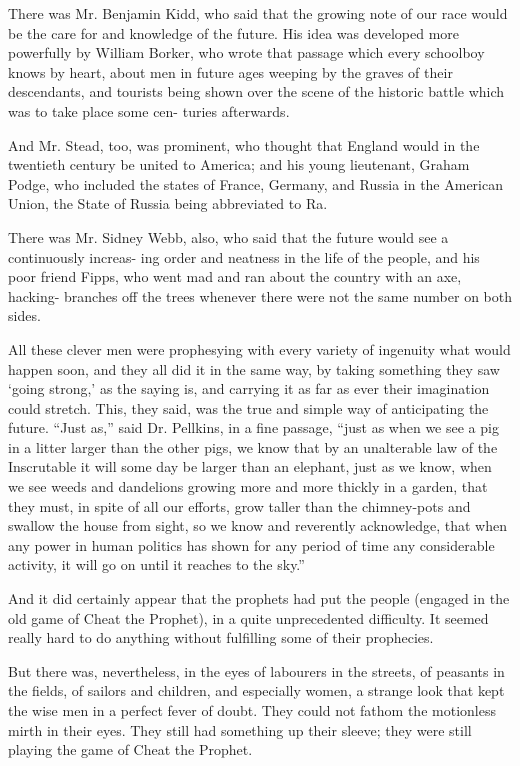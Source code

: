 \documentclass{book}
\begin{document}
There was Mr. Benjamin Kidd, who said that the growing note of our race would be the care for and knowledge of the future. His idea was developed more powerfully by William Borker, who wrote that passage which every schoolboy knows by heart, about men in future ages weeping by the graves of their descendants, and tourists being shown over the scene of the historic battle which was to take place some cen- turies afterwards.

And Mr. Stead, too, was prominent, who thought that England would in the twentieth century be united to America; and his young lieutenant, Graham Podge, who included the states of France, Germany, and Russia in the American Union, the State of Russia being abbreviated to Ra.

There was Mr. Sidney Webb, also, who said that the future would see a continuously increas- ing order and neatness in the life of the people, and his poor friend Fipps, who went mad and ran about the country with an axe, hacking- branches off the trees whenever there were not the same number on both sides.

All these clever men were prophesying with every variety of ingenuity what would happen soon, and they all did it in the same way, by taking something they saw ‘going strong,’ as the saying is, and carrying it as far as ever their imagination could stretch. This, they said, was the true and simple way of anticipating the future. “Just as,” said Dr. Pellkins, in a fine passage, “just as when we see a pig in a litter larger than the other pigs, we know that by an unalterable law of the Inscrutable it will some day be larger than an elephant, just as we know, when we see weeds and dandelions growing more and more thickly in a garden, that they must, in spite of all our efforts, grow taller than the chimney-pots and swallow the house from sight, so we know and reverently acknowledge, that when any power in human politics has shown for any period of time any considerable activity, it will go on until it reaches to the sky.”

And it did certainly appear that the prophets had put the people (engaged in the old game of Cheat the Prophet), in a quite unprecedented difficulty. It seemed really hard to do anything without fulfilling some of their prophecies.

But there was, nevertheless, in the eyes of labourers in the streets, of peasants in the fields, of sailors and children, and especially women, a strange look that kept the wise men in a perfect fever of doubt. They could not fathom the motionless mirth in their eyes. They still had something up their sleeve; they were still playing the game of Cheat the Prophet.
\end{document}
